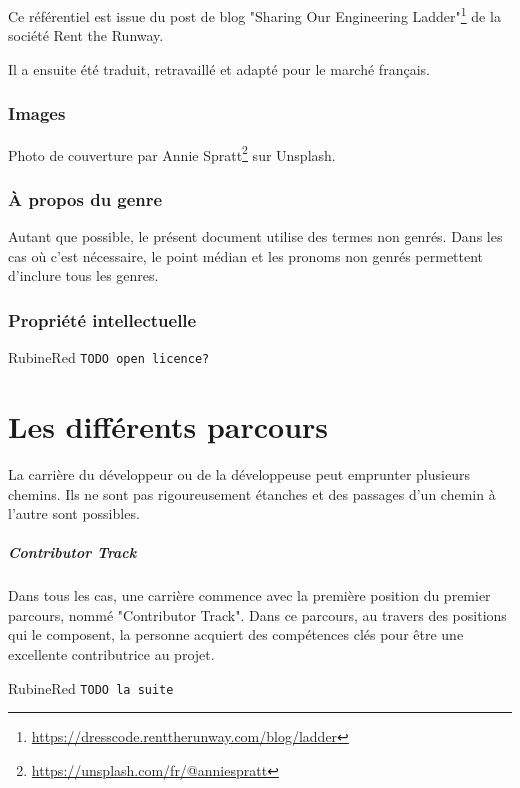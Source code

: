 \documentclass[a4paper, french, openany, 12pt]{book}
\newcommand{\fullwidthimage}[1]{
  \begin{center}
    \makebox[\textwidth]{\texttt{[image: \#1]}}
  \end{center}
}
\newcommand{\todo}[1]{
  \begin{color}{RubineRed}
    \texttt{TODO {#1}}
  \end{color}
}
\begin{document}
Ce référentiel est issue du post de blog 
"Sharing Our Engineering Ladder"\footnote{\url{https://dresscode.renttherunway.com/blog/ladder}}
de la société Rent the Runway.

Il a ensuite été traduit, retravaillé et adapté pour le marché français.

\section*{Images}

Photo de couverture par Annie Spratt\footnote{\url{https://unsplash.com/fr/@anniespratt}} sur Unsplash.

\section*{À propos du genre}

Autant que possible, le présent document utilise des termes non genrés.
Dans les cas où c'est nécessaire, le point médian et les pronoms non genrés permettent d'inclure tous les genres.

\section*{Propriété intellectuelle}

\todo{open licence?}

\mainmatter

\part{Les différents parcours}

\fullwidthimage{images/tracks.png}

La carrière du développeur ou de la développeuse peut emprunter plusieurs chemins.
Ils ne sont pas rigoureusement étanches et des passages d'un chemin à l'autre sont possibles.

\subsubsection*{Contributor Track}

Dans tous les cas, une carrière commence avec la première position du premier parcours, nommé "Contributor Track".
Dans ce parcours, au travers des positions qui le composent, la personne acquiert des compétences clés pour être une
excellente contributrice au projet.

\todo{la suite}
\end{document}
